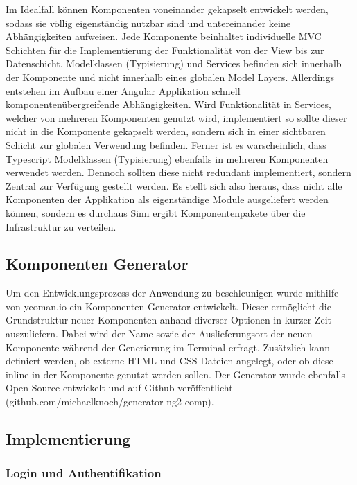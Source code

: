 Im Idealfall können Komponenten voneinander gekapselt entwickelt werden,
sodass sie völlig eigenständig nutzbar sind und untereinander keine Abhängigkeiten aufweisen.
Jede Komponente beinhaltet individuelle \ac{MVC} Schichten für die Implementierung der Funktionalität von der View bis zur Datenschicht.
Modelklassen (Typisierung) und Services befinden sich innerhalb der Komponente und nicht innerhalb eines globalen Model Layers.
Allerdings entstehen im Aufbau einer Angular Applikation schnell komponentenübergreifende Abhängigkeiten.
Wird Funktionalität in Services, welcher von mehreren Komponenten genutzt wird, implementiert
so sollte dieser nicht in die Komponente gekapselt werden, sondern sich in einer sichtbaren Schicht zur globalen Verwendung befinden.
Ferner ist es warscheinlich, dass Typescript Modelklassen (Typisierung) ebenfalls in mehreren Komponenten verwendet werden.
Dennoch sollten diese nicht redundant implementiert,
sondern Zentral zur Verfügung gestellt werden. Es stellt sich also heraus,
dass nicht alle Komponenten der Applikation \projectname{} als eigenständige Module ausgeliefert werden können,
sondern es durchaus Sinn ergibt Komponentenpakete über die Infrastruktur zu verteilen.


\subsection{Komponenten Generator}

Um den Entwicklungsprozess der Anwendung zu beschleunigen wurde mithilfe von yeoman.io ein Komponenten-Generator entwickelt.
Dieser ermöglicht die Grundstruktur neuer Komponenten anhand diverser Optionen in kurzer Zeit auszuliefern.
Dabei wird der Name sowie der Auslieferungsort der neuen Komponente während der Generierung im Terminal erfragt.
Zusätzlich kann definiert werden, ob externe \ac{HTML} und \ac{CSS} Dateien angelegt, oder ob diese inline in der Komponente genutzt werden sollen.
Der Generator wurde ebenfalls Open Source entwickelt und auf Github veröffentlicht
(github.com/michaelknoch/generator-ng2-comp).

\subsection{Implementierung}


\subsubsection{Login und Authentifikation}

